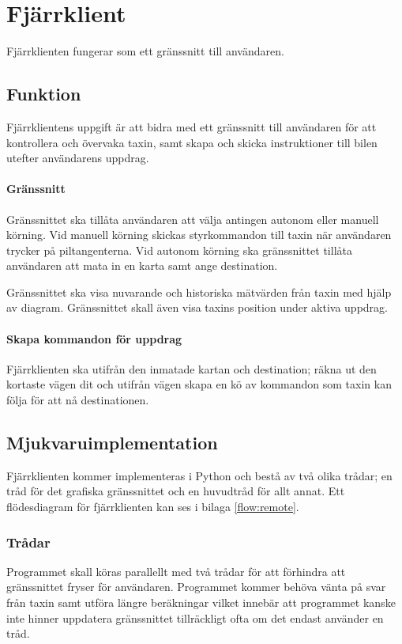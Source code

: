 \documentclass[designspec/spec.tex]{subfiles}
\begin{document}
\section{Fjärrklient}
Fjärrklienten fungerar som ett gränssnitt till användaren.

\subsection{Funktion}
Fjärrklientens uppgift är att bidra med ett gränssnitt till användaren för att
kontrollera och övervaka taxin, samt skapa och skicka instruktioner till bilen
utefter användarens uppdrag.

\paragraph{Gränssnitt}
Gränssnittet ska tillåta användaren att välja antingen autonom eller manuell
körning. Vid manuell körning skickas styrkommandon till taxin när användaren
trycker på piltangenterna. Vid autonom körning ska gränssnittet tillåta
användaren att mata in en karta samt ange destination.

Gränssnittet ska visa nuvarande och historiska mätvärden från taxin med hjälp
av diagram. Gränssnittet skall även visa taxins position under aktiva uppdrag.

\paragraph{Skapa kommandon för uppdrag}
Fjärrklienten ska utifrån den inmatade kartan och destination; räkna ut den
kortaste vägen dit och utifrån vägen skapa en kö av kommandon som taxin kan
följa för att nå destinationen.

\subsection{Mjukvaruimplementation}
Fjärrklienten kommer implementeras i Python och bestå av två olika trådar; en
tråd för det grafiska gränssnittet och en huvudtråd för allt annat. Ett
flödesdiagram för fjärrklienten kan ses i bilaga \ref{flow:remote}.

\subsubsection{Trådar}
Programmet skall köras parallellt med två trådar för att förhindra att
gränssnittet fryser för användaren. Programmet kommer behöva vänta på svar från
taxin samt utföra längre beräkningar vilket innebär att programmet kanske inte
hinner uppdatera gränssnittet tillräckligt ofta om det endast använder en tråd.
\end{document}
